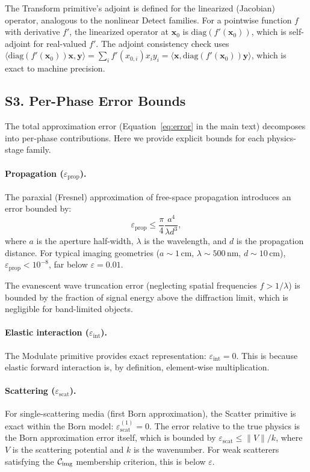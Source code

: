 The Transform primitive's adjoint is defined for the linearized (Jacobian) operator, analogous to the nonlinear Detect families. For a pointwise function $f$ with derivative $f'$, the linearized operator at $\mathbf{x}_0$ is $\mathrm{diag}(f'(\mathbf{x}_0))$, which is self-adjoint for real-valued $f'$. The adjoint consistency check uses $\langle \mathrm{diag}(f'(\mathbf{x}_0)) \mathbf{x}, \mathbf{y} \rangle = \sum_i f'(x_{0,i}) x_i y_i = \langle \mathbf{x}, \mathrm{diag}(f'(\mathbf{x}_0)) \mathbf{y} \rangle$, which is exact to machine precision.


\subsection*{S3. Per-Phase Error Bounds}
\label{sec:supp_error}

The total approximation error (Equation~\ref{eq:error} in the main text) decomposes into per-phase contributions. Here we provide explicit bounds for each physics-stage family.

\paragraph{Propagation ($\varepsilon_{\mathrm{prop}}$).}
The paraxial (Fresnel) approximation of free-space propagation introduces an error bounded by:
\begin{equation}
  \varepsilon_{\mathrm{prop}} \leq \frac{\pi}{4} \frac{a^4}{\lambda d^3},
\end{equation}
where $a$ is the aperture half-width, $\lambda$ is the wavelength, and $d$ is the propagation distance. For typical imaging geometries ($a \sim 1$\,cm, $\lambda \sim 500$\,nm, $d \sim 10$\,cm), $\varepsilon_{\mathrm{prop}} < 10^{-8}$, far below $\varepsilon = 0.01$.

The evanescent wave truncation error (neglecting spatial frequencies $f > 1/\lambda$) is bounded by the fraction of signal energy above the diffraction limit, which is negligible for band-limited objects.

\paragraph{Elastic interaction ($\varepsilon_{\mathrm{int}}$).}
The Modulate primitive provides exact representation: $\varepsilon_{\mathrm{int}} = 0$. This is because elastic forward interaction is, by definition, element-wise multiplication.

\paragraph{Scattering ($\varepsilon_{\mathrm{scat}}$).}
For single-scattering media (first Born approximation), the Scatter primitive is exact within the Born model: $\varepsilon_{\mathrm{scat}}^{(1)} = 0$. The error relative to the true physics is the Born approximation error itself, which is bounded by $\varepsilon_{\mathrm{scat}} \leq \|V\|/k$, where $V$ is the scattering potential and $k$ is the wavenumber. For weak scatterers satisfying the $\mathcal{C}_{\mathrm{img}}$ membership criterion, this is below $\varepsilon$.

